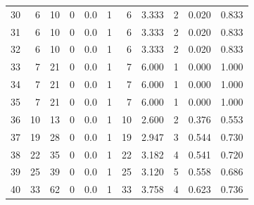 \documentclass{article}
\theoremstyle{definition}
\begin{document}
\begin{table}[!hbtp]
{\begin{tabular}{lrrrrrrrrrr}
            30 &        6 &       10 &                 0 &               0.0 &                       1 &                          6 &       3.333 &              2 &       0.020 &             0.833 \\
            31 &        6 &       10 &                 0 &               0.0 &                       1 &                          6 &       3.333 &              2 &       0.020 &             0.833 \\
            32 &        6 &       10 &                 0 &               0.0 &                       1 &                          6 &       3.333 &              2 &       0.020 &             0.833 \\
            33 &        7 &       21 &                 0 &               0.0 &                       1 &                          7 &       6.000 &              1 &       0.000 &             1.000 \\
            34 &        7 &       21 &                 0 &               0.0 &                       1 &                          7 &       6.000 &              1 &       0.000 &             1.000 \\
            35 &        7 &       21 &                 0 &               0.0 &                       1 &                          7 &       6.000 &              1 &       0.000 &             1.000 \\
            36 &       10 &       13 &                 0 &               0.0 &                       1 &                         10 &       2.600 &              2 &       0.376 &             0.553 \\
            37 &       19 &       28 &                 0 &               0.0 &                       1 &                         19 &       2.947 &              3 &       0.544 &             0.730 \\
            38 &       22 &       35 &                 0 &               0.0 &                       1 &                         22 &       3.182 &              4 &       0.541 &             0.720 \\
            39 &       25 &       39 &                 0 &               0.0 &                       1 &                         25 &       3.120 &              5 &       0.558 &             0.686 \\
            40 &       33 &       62 &                 0 &               0.0 &                       1 &                         33 &       3.758 &              4 &       0.623 &             0.736 \\

\end{tabular}}
\end{table}
\end{document}
